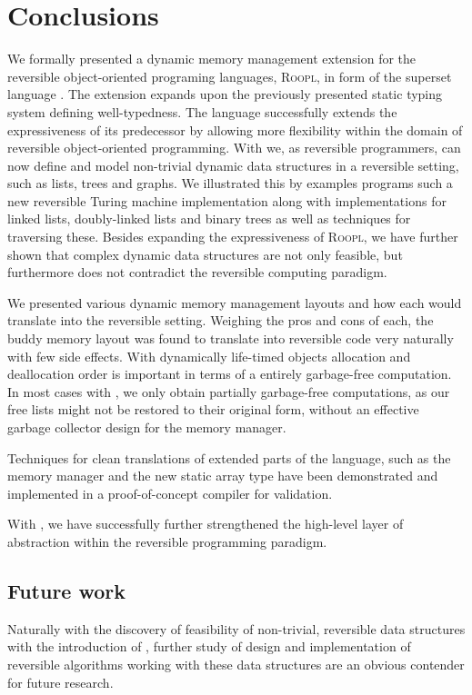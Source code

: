 \chapter{Conclusions}
\label{chp:conclusions}
We formally presented a dynamic memory management extension for the reversible object-oriented programing languages, \textsc{Roopl}, in form of the superset language \rooplpp. The extension expands upon the previously presented static typing system defining well-typedness. The language successfully extends the expressiveness of its predecessor by allowing more flexibility within the domain of reversible object-oriented programming. With \rooplpp we, as reversible programmers, can now define and model non-trivial dynamic data structures in a reversible setting, such as lists, trees and graphs. We illustrated this by examples programs such a new reversible Turing machine implementation along with implementations for linked lists, doubly-linked lists and binary trees as well as techniques for traversing these. Besides expanding the expressiveness of \textsc{Roopl}, we have further shown that complex dynamic data structures are not only feasible, but furthermore does not contradict the reversible computing paradigm.

We presented various dynamic memory management layouts and how each would translate into the reversible setting. Weighing the pros and cons of each, the buddy memory layout was found to translate into reversible code very naturally with few side effects. With dynamically life-timed objects allocation and deallocation order is important in terms of a entirely garbage-free computation. In most cases with \rooplpp, we only obtain partially garbage-free computations, as our free lists might not be restored to their original form, without an effective garbage collector design for the memory manager.

Techniques for clean translations of extended parts of the language, such as the memory manager and the new static array type have been demonstrated and implemented in a proof-of-concept compiler for validation.

With \rooplpp, we have successfully further strengthened the high-level layer of abstraction within the reversible programming paradigm.  

\section{Future work}
\label{sec:future-work}
Naturally with the discovery of feasibility of non-trivial, reversible data structures with the introduction of \rooplpp, further study of design and implementation of reversible algorithms working with these data structures are an obvious contender for future research.

